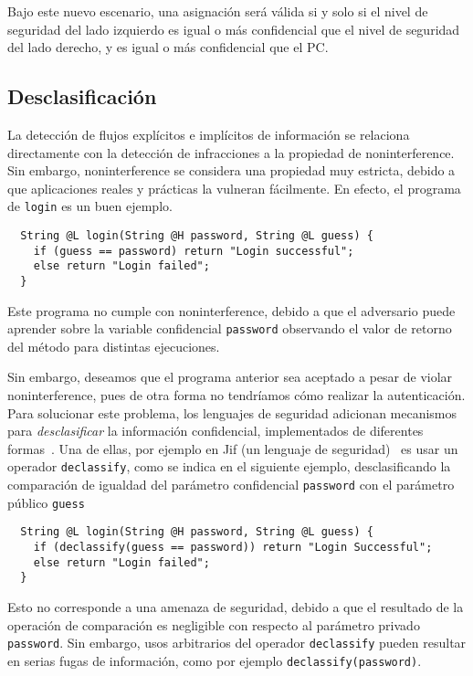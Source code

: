 Bajo este nuevo escenario, una asignación será válida si y solo si el nivel de seguridad del lado izquierdo es igual o más confidencial que el nivel de seguridad del lado derecho, y es igual o más confidencial que el PC.

\subsection{Desclasificación}
La detección de flujos explícitos e implícitos de información se relaciona directamente con la detección de infracciones a la propiedad de noninterference. Sin embargo, noninterference se considera una propiedad muy estricta, debido a que aplicaciones reales y prácticas la vulneran fácilmente. En efecto, el programa de \texttt{login} es un buen ejemplo.

\begin{lstlisting}
  String @L login(String @H password, String @L guess) {
    if (guess == password) return "Login successful";
    else return "Login failed";
  }
\end{lstlisting}

Este programa no cumple con noninterference, debido a que el adversario puede aprender sobre la variable confidencial \texttt{password} observando el valor de retorno del método para distintas ejecuciones.

Sin embargo, deseamos que el programa anterior sea aceptado a pesar de violar noninterference, pues de otra forma no tendríamos cómo realizar la autenticación. Para solucionar este problema, los lenguajes de seguridad adicionan mecanismos para \textit{desclasificar} la información confidencial, implementados de diferentes formas~\cite{sabelfeldSands:JCS09}. Una de ellas, por ejemplo en Jif (un lenguaje de seguridad)~\cite{jif} es usar un operador \texttt{declassify}, como se indica en el siguiente ejemplo, desclasificando la comparación de igualdad del parámetro confidencial \texttt{password} con el parámetro público \texttt{guess}

\begin{lstlisting}
  String @L login(String @H password, String @L guess) {
    if (declassify(guess == password)) return "Login Successful";
    else return "Login failed";
  }
\end{lstlisting}

Esto no corresponde a una amenaza de seguridad, debido a que el resultado de la operación de comparación es negligible con respecto al parámetro privado \texttt{password}. Sin embargo, usos arbitrarios del operador \texttt{declassify} pueden resultar en serias fugas de información, como por ejemplo \texttt{declassify(password)}.
